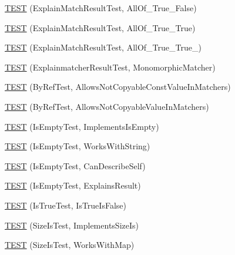 \begin{DoxyCompactItemize}
\item 
\mbox{\hyperlink{namespacetesting_1_1gmock__matchers__test_a5d386691eaed59994a1d2b65f94b23a9}{T\+E\+ST}} (Explain\+Match\+Result\+Test, All\+Of\+\_\+\+True\+\_\+\+False)
\item 
\mbox{\hyperlink{namespacetesting_1_1gmock__matchers__test_a16545b298640b253502d604f52ea95e2}{T\+E\+ST}} (Explain\+Match\+Result\+Test, All\+Of\+\_\+\+True\+\_\+\+True)
\item 
\mbox{\hyperlink{namespacetesting_1_1gmock__matchers__test_af1ba4010a24716a51a302f9a518023b5}{T\+E\+ST}} (Explain\+Match\+Result\+Test, All\+Of\+\_\+\+True\+\_\+\+True\+\_)
\item 
\mbox{\hyperlink{namespacetesting_1_1gmock__matchers__test_a102b10d9064f6e0037e3f3f0c3e76e22}{T\+E\+ST}} (Explainmatcher\+Result\+Test, Monomorphic\+Matcher)
\item 
\mbox{\hyperlink{namespacetesting_1_1gmock__matchers__test_aab82f120c70dc7d8bc2fd74ac6897486}{T\+E\+ST}} (By\+Ref\+Test, Allows\+Not\+Copyable\+Const\+Value\+In\+Matchers)
\item 
\mbox{\hyperlink{namespacetesting_1_1gmock__matchers__test_a5ed7b822889a34f018c2ba8f21941fd4}{T\+E\+ST}} (By\+Ref\+Test, Allows\+Not\+Copyable\+Value\+In\+Matchers)
\item 
\mbox{\hyperlink{namespacetesting_1_1gmock__matchers__test_ab63796f77c7572f6f1aef01cb140f99e}{T\+E\+ST}} (Is\+Empty\+Test, Implements\+Is\+Empty)
\item 
\mbox{\hyperlink{namespacetesting_1_1gmock__matchers__test_a22f0cacccee169b7390741b9815f4281}{T\+E\+ST}} (Is\+Empty\+Test, Works\+With\+String)
\item 
\mbox{\hyperlink{namespacetesting_1_1gmock__matchers__test_adcf3743190f973f2773296d0772e8950}{T\+E\+ST}} (Is\+Empty\+Test, Can\+Describe\+Self)
\item 
\mbox{\hyperlink{namespacetesting_1_1gmock__matchers__test_a1c168c284000d05d63bf5e9df10d1b7c}{T\+E\+ST}} (Is\+Empty\+Test, Explains\+Result)
\item 
\mbox{\hyperlink{namespacetesting_1_1gmock__matchers__test_a1cd170a421c94a8edf104b72ee1f396d}{T\+E\+ST}} (Is\+True\+Test, Is\+True\+Is\+False)
\item 
\mbox{\hyperlink{namespacetesting_1_1gmock__matchers__test_abe619d5d1910e1f2e8b169622d1d8592}{T\+E\+ST}} (Size\+Is\+Test, Implements\+Size\+Is)
\item 
\mbox{\hyperlink{namespacetesting_1_1gmock__matchers__test_aea77169d6c56b88b5c99273d5a2bc0f2}{T\+E\+ST}} (Size\+Is\+Test, Works\+With\+Map)

\end{DoxyCompactItemize}
